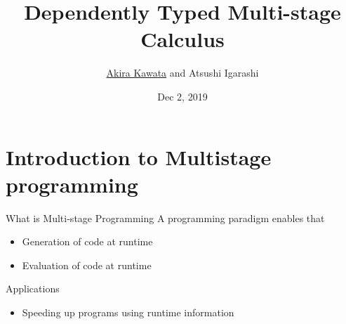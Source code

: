 \documentclass[dvipdfmx,aspectratio=169, 20pt]{beamer}
\title{Dependently Typed Multi-stage Calculus}
\author{\underline{Akira Kawata} and Atsushi Igarashi}
\institute{Gradudate School of Informatics, Kyoto University}
\date{Dec 2, 2019}
\begin{document}
\maketitle


\section{Introduction to Multistage programming}

\begin{frame}[fragile]{What is Multi-stage Programming}
    A programming paradigm enables that
    \begin{itemize}
        \item Generation of code at runtime
        \item Evaluation of code at runtime
    \end{itemize}
    Applications
    \begin{itemize}
        \item Speeding up programs using runtime information
    \end{itemize}
    \note{
    }
\end{frame}

\end{document}
